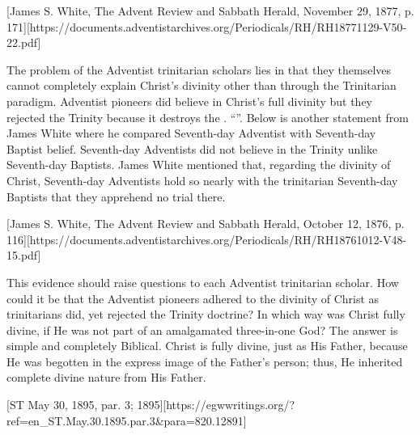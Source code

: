 [James S. White, The Advent Review and Sabbath Herald, November 29, 1877, p. 171][https://documents.adventistarchives.org/Periodicals/RH/RH18771129-V50-22.pdf]

The problem of the Adventist trinitarian scholars lies in that they themselves cannot completely explain Christ’s divinity other than through the Trinitarian paradigm. Adventist pioneers did believe in Christ’s full divinity but they rejected the Trinity because it destroys the . “”. Below is another statement from James White where he compared Seventh-day Adventist with Seventh-day Baptist belief. Seventh-day Adventists did not believe in the Trinity unlike Seventh-day Baptists. James White mentioned that, regarding the divinity of Christ, Seventh-day Adventists hold so nearly with the trinitarian Seventh-day Baptists that they apprehend no trial there.

[James S. White, The Advent Review and Sabbath Herald, October 12, 1876, p. 116][https://documents.adventistarchives.org/Periodicals/RH/RH18761012-V48-15.pdf]

This evidence should raise questions to each Adventist trinitarian scholar. How could it be that the Adventist pioneers adhered to the divinity of Christ as trinitarians did, yet rejected the Trinity doctrine? In which way was Christ fully divine, if He was not part of an amalgamated three-in-one God? The answer is simple and completely Biblical. Christ is fully divine, just as His Father, because He was begotten in the express image of the Father’s person; thus, He inherited complete divine nature from His Father.

[ST May 30, 1895, par. 3; 1895][https://egwwritings.org/?ref=en\_ST.May.30.1895.par.3&para=820.12891]

